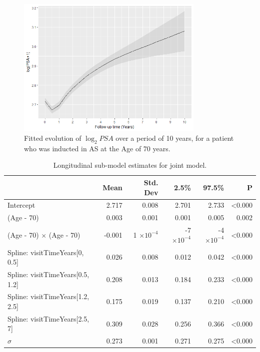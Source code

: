 \begin{figure}[!htb]
	\centering
    \captionsetup{justification=centering}
	\includegraphics[width=0.8\textwidth]{fitted_trend_psa.png}
	\caption{Fitted evolution of $\log_2 PSA$ over a period of 10 years, for a patient who was inducted in AS at the Age of 70 years.}
	\label{fig : fitted_trend_psa}
\end{figure}

\begin{table}[!htb]
\centering
\caption{Longitudinal sub-model estimates for joint model.}
\label{tab : PSA_long}
\captionsetup{justification=centering}
\begin{tabular}{@{}lrrrrr@{}}
\toprule
                                     & Mean   & Std. Dev           & 2.5\%               & 97.5\%              & P              \\ \midrule
Intercept                            & 2.717  & 0.008              & 2.701               & 2.733               & \textless0.000 \\
(Age - 70)                           & 0.003  & 0.001              & 0.001               & 0.005               & 0.002          \\
(Age - 70) $\times$ (Age - 70)       & -0.001 & 1 $\times 10^{-4}$ & -7 $\times 10^{-4}$ & -4 $\times 10^{-4}$ & \textless0.000 \\
Spline: visitTimeYears{[}0, 0.5{]}   & 0.026  & 0.008              & 0.012               & 0.042               & \textless0.000 \\
Spline: visitTimeYears{[}0.5, 1.2{]} & 0.208  & 0.013              & 0.184               & 0.233               & \textless0.000 \\
Spline: visitTimeYears{[}1.2, 2.5{]} & 0.175  & 0.019              & 0.137               & 0.210               & \textless0.000 \\
Spline: visitTimeYears{[}2.5, 7{]}   & 0.309  & 0.028              & 0.256               & 0.366               & \textless0.000 \\
$\sigma$                               & 0.273  & 0.001              & 0.271               & 0.275               & \textless0.000 \\ \bottomrule
\end{tabular}
\end{table}

